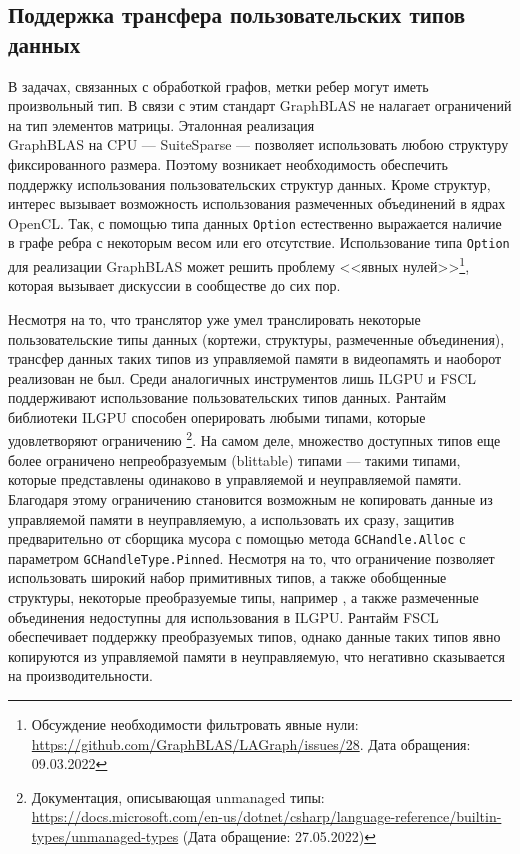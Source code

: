 \subsection{Поддержка трансфера пользовательских типов данных}
В задачах, связанных с обработкой графов, метки ребер могут иметь произвольный тип. В связи с этим стандарт GraphBLAS не налагает ограничений на тип элементов матрицы. Эталонная реализация \\ GraphBLAS на CPU --- SuiteSparse --- позволяет использовать любою структуру фиксированного размера. Поэтому возникает необходимость обеспечить поддержку использования пользовательских структур данных. Кроме структур, интерес вызывает возможность использования размеченных объединений в ядрах OpenCL. Так, с помощью типа данных \verb|Option| естественно выражается наличие в графе ребра с некоторым весом или его отсутствие. Использование типа \verb|Option| для реализации GraphBLAS может решить проблему <<явных нулей>>\footnote{Обсуждение необходимости фильтровать явные нули: \url{https://github.com/GraphBLAS/LAGraph/issues/28}. Дата обращения: 09.03.2022}, которая вызывает дискуссии в сообществе до сих пор.

Несмотря на то, что транслятор уже умел транслировать некоторые пользовательские типы данных (кортежи, структуры, размеченные объединения), трансфер данных таких типов из управляемой памяти в видеопамять и наоборот реализован не был. Среди аналогичных инструментов лишь ILGPU и FSCL поддерживают использование пользовательских типов данных. Рантайм библиотеки ILGPU способен оперировать любыми типами, которые удовлетворяют ограничению \footnote{Документация, описывающая unmanaged типы: \url{https://docs.microsoft.com/en-us/dotnet/csharp/language-reference/builtin-types/unmanaged-types} (Дата обращение: 27.05.2022)}. На самом деле, множество доступных типов еще более ограничено непреобразуемым (blittable) типами --- такими типами, которые представлены одинаково в управляемой и неуправляемой памяти. Благодаря этому ограничению становится возможным не копировать данные из управляемой памяти в неуправляемую, а использовать их сразу, защитив предварительно от сборщика мусора с помощью метода \verb|GCHandle.Alloc| с параметром \verb|GCHandleType.Pinned|. Несмотря на то, что ограничение  позволяет использовать широкий набор примитивных типов, а также обобщенные структуры, некоторые преобразуемые типы, например , а также размеченные объединения недоступны для использования в ILGPU. Рантайм FSCL обеспечивает поддержку преобразуемых типов, однако данные таких типов явно копируются из управляемой памяти в неуправляемую, что негативно сказывается на производительности.

